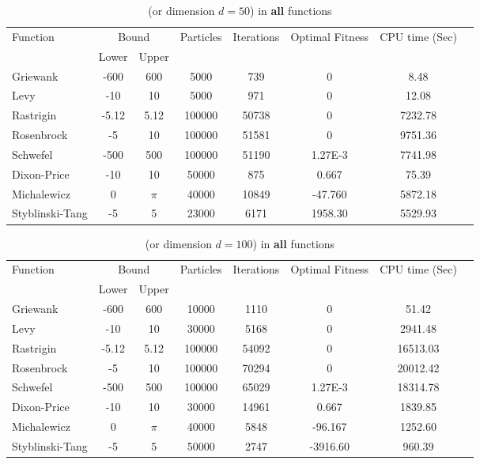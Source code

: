 \documentclass[12pt]{article}
\begin{document}
	
	\begin{table}[H]
		\caption{ (or dimension $d=50$) in \textbf{all} functions}
		\label{table:1}
		\centering
		\begin{tabular}{l c c c c c c c}
			\hline
			Function &  \multicolumn{2}{c}{Bound} & Particles & Iterations &  Optimal Fitness & CPU time (Sec) \\
			& Lower& Upper&&&\\
			\hline
			Griewank  		&  -600   & 600 	&5000 &739 &0 &8.48 &\\
			Levy 	  		&  -10    & 10 		&5000 &971 &0 &12.08 &\\
			Rastrigin 		&  -5.12  & 5.12 	&100000 &50738 &0 &7232.78 &\\
			Rosenbrock		&  -5     & 10 		&100000 &51581 &0 &9751.36 &\\
			Schwefel 	 	&  -500   & 500 	&100000 &51190 &1.27E-3 &7741.98 &\\
			Dixon-Price 	&   -10	  & 10 		&50000 &875 &0.667 &75.39 &\\
			Michalewicz 	&   0 	  & $\pi$ 	&40000 &10849 &-47.760 &5872.18 &\\
			Styblinski-Tang & -5 	  & 5  		&23000 &6171 &1958.30 &5529.93 &\\
			\hline
		\end{tabular}
	\end{table}
	
	\begin{table}[H]
		\caption{ (or dimension $d=100$) in \textbf{all} functions}
		\label{table:1}
		\centering
		\begin{tabular}{l c c c c c c c}
			\hline
			Function &  \multicolumn{2}{c}{Bound} & Particles & Iterations &  Optimal Fitness & CPU time (Sec) \\
			& Lower& Upper&&&\\
			\hline
			Griewank  		&  -600   & 600 		&10000 &1110 &0 &51.42 &\\
			Levy 	  		&  -10    & 10 		&30000 &5168 &0 &2941.48 &\\
			Rastrigin 		&  -5.12  & 5.12 	&100000 &54092 &0 &16513.03 &\\
			Rosenbrock		&  -5     & 10 		&100000 &70294 &0 &20012.42 &\\
			Schwefel 	 	&  -500   & 500 	&100000 &65029 &1.27E-3 &18314.78 &\\
			Dixon-Price 	&   -10	  & 10 		&30000 &14961 &0.667 &1839.85 &\\
			Michalewicz 	&   0 	  & $\pi$ 	&40000 &5848 &-96.167 &1252.60 &\\
			Styblinski-Tang & -5 	  & 5  		&50000 &2747 &-3916.60 &960.39 &\\
			\hline
		\end{tabular}
	\end{table}
	
\end{document}
